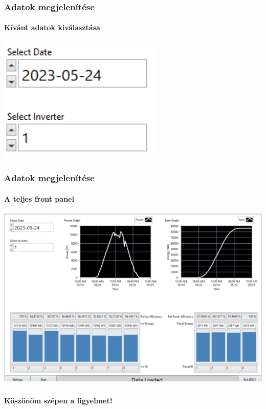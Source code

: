 \documentclass{beamer}
\begin{document}
\begin{frame}
  \frametitle{Αdatok megjelenítése}
  \framesubtitle{Kívánt adatok kiválasztása}

  \centering
  \includegraphics[width=.5\textwidth]{static/windows-ring.png}
\end{frame}

\begin{frame}
  \frametitle{Αdatok megjelenítése}
  \framesubtitle{A teljes front panel}

  \centering
  \includegraphics[height=.65\textwidth]{static/windows-fp.png}
\end{frame}

\begin{frame}
  \frametitle{\;}
  \framesubtitle{}

  \centering
  {
    \LARGE\bfseries
    Köszönöm szépen a figyelmet!
  }
\end{frame}
\end{document}

